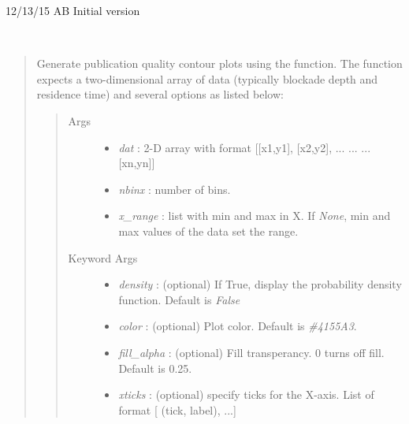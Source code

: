 \documentclass[letterpaper,10pt,english]{sphinxmanual}
\begin{document}
\begin{DUlineblock}{0em}
\item[] 12/13/15                AB      Initial version
\end{DUlineblock}

\begin{fulllineitems}
\label{api-doc/mosaicscripts:mosaicscripts.plots.histogram.histogram_plot}~\begin{quote}

Generate publication quality contour plots using the  function. The function expects a two-dimensional array of data (typically blockade depth and residence time) and several options as listed below:
\begin{quote}\begin{description}
\item[{Args}] \leavevmode\begin{itemize}
\item {} 
\emph{dat} :                           2-D array with format {[}{[}x1,y1{]}, {[}x2,y2{]}, ... ... ... {[}xn,yn{]}{]}

\item {} 
\emph{nbinx} :                             number of bins.

\item {} 
\emph{x\_range} :                   list with min and max in X. If \emph{None}, min and max values of the data set the range.

\end{itemize}

\item[{Keyword Args}] \leavevmode\begin{itemize}
\item {} 
\emph{density} :                   (optional) If True, display the probability density function. Default is \emph{False}

\item {} 
\emph{color} :                             (optional) Plot color. Default is \emph{\#4155A3}.

\item {} 
\emph{fill\_alpha} :                (optional) Fill transperancy. 0 turns off fill. Default is 0.25.

\item {} 
\emph{xticks} :                    (optional) specify ticks for the X-axis. List of format {[} (tick, label), ...{]}


\end{itemize}
\end{description}
\end{quote}
\end{quote}
\end{fulllineitems}
\end{document}
